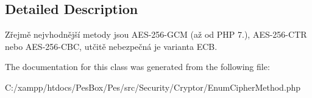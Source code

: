 \subsection{Detailed Description}

\begin{DoxyItemize}
\item Zřejmě nejvhodnější metody jsou A\+E\+S-\/256-\/\+G\+CM (až od P\+HP 7.), A\+E\+S-\/256-\/\+C\+TR nebo A\+E\+S-\/256-\/\+C\+BC, utčitě nebezpečná je varianta E\+CB. 
\end{DoxyItemize}

The documentation for this class was generated from the following file\+:\begin{DoxyCompactItemize}
\item 
C\+:/xampp/htdocs/\+Pes\+Box/\+Pes/src/\+Security/\+Cryptor/Enum\+Cipher\+Method.\+php\end{DoxyCompactItemize}
